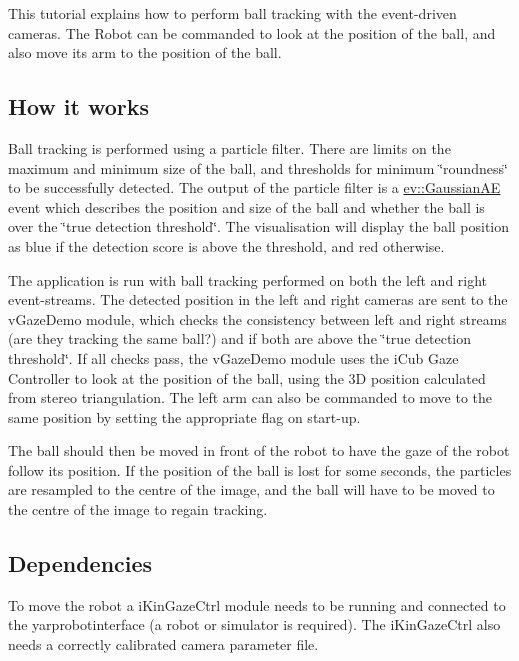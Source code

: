 This tutorial explains how to perform ball tracking with the event-\/driven cameras. The Robot can be commanded to look at the position of the ball, and also move its arm to the position of the ball.



\subsection*{How it works}

Ball tracking is performed using a particle filter. There are limits on the maximum and minimum size of the ball, and thresholds for minimum \char`\"{}roundness\char`\"{} to be successfully detected. The output of the particle filter is a \hyperlink{classev_1_1GaussianAE}{ev\+::\+Gaussian\+AE} event which describes the position and size of the ball and whether the ball is over the \char`\"{}true detection threshold\char`\"{}. The visualisation will display the ball position as blue if the detection score is above the threshold, and red otherwise.

The application is run with ball tracking performed on both the left and right event-\/streams. The detected position in the left and right cameras are sent to the v\+Gaze\+Demo module, which checks the consistency between left and right streams (are they tracking the same ball?) and if both are above the \char`\"{}true detection threshold\char`\"{}. If all checks pass, the v\+Gaze\+Demo module uses the i\+Cub Gaze Controller to look at the position of the ball, using the 3D position calculated from stereo triangulation. The left arm can also be commanded to move to the same position by setting the appropriate flag on start-\/up.

The ball should then be moved in front of the robot to have the gaze of the robot follow its position. If the position of the ball is lost for some seconds, the particles are resampled to the centre of the image, and the ball will have to be moved to the centre of the image to regain tracking.

\subsection*{Dependencies}

To move the robot a i\+Kin\+Gaze\+Ctrl module needs to be running and connected to the yarprobotinterface (a robot or simulator is required). The i\+Kin\+Gaze\+Ctrl also needs a correctly calibrated camera parameter file.

